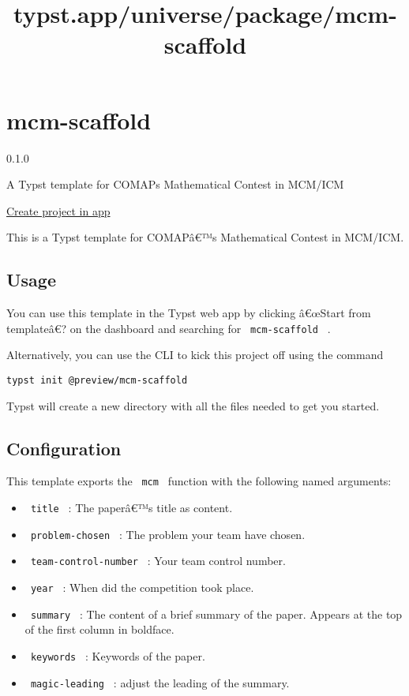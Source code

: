 \title{typst.app/universe/package/mcm-scaffold}

\label{banner}
\label{template-thumbnail}

\section{mcm-scaffold}\label{mcm-scaffold}

{ 0.1.0 }

A Typst template for COMAP\textquotesingle s Mathematical Contest in
MCM/ICM

\href{/app?template=mcm-scaffold&version=0.1.0}{Create project in app}

\label{readme}
This is a Typst template for COMAPâ€™s Mathematical Contest in MCM/ICM.

\subsection{Usage}\label{usage}

You can use this template in the Typst web app by clicking â€œStart from
templateâ€? on the dashboard and searching for \texttt{\ mcm-scaffold\ }
.

Alternatively, you can use the CLI to kick this project off using the
command

\begin{verbatim}
typst init @preview/mcm-scaffold
\end{verbatim}

Typst will create a new directory with all the files needed to get you
started.

\subsection{Configuration}\label{configuration}

This template exports the \texttt{\ mcm\ } function with the following
named arguments:

\begin{itemize}
\tightlist
\item
  \texttt{\ title\ } : The paperâ€™s title as content.
\item
  \texttt{\ problem-chosen\ } : The problem your team have chosen.
\item
  \texttt{\ team-control-number\ } : Your team control number.
\item
  \texttt{\ year\ } : When did the competition took place.
\item
  \texttt{\ summary\ } : The content of a brief summary of the paper.
  Appears at the top of the first column in boldface.
\item
  \texttt{\ keywords\ } : Keywords of the paper.
\item
  \texttt{\ magic-leading\ } : adjust the leading of the summary.
\end{itemize}


